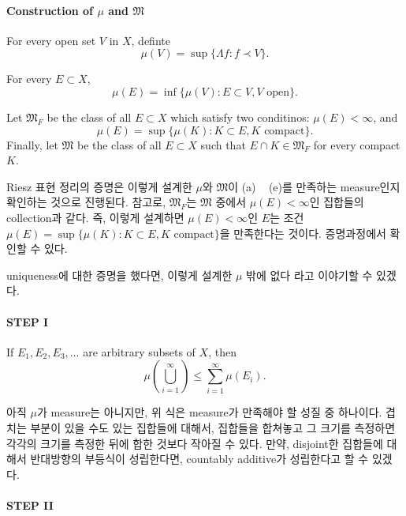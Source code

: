 \documentclass[11pt,reqno]{amsart}
\renewcommand{\(}{\left(}
\renewcommand{\)}{\right)}
\renewcommand{\[}{\left[}
\renewcommand{\]}{\right]}
\newcommand{\M}{\mathfrak{M}}
\begin{document}
\paragraph{Construction of $\mu$ and $\M$}

For every open set $V$ in $X$, definte 
\begin{equation}
  \mu (V) = \sup \{ \Lambda f : f \prec V \}.
\end{equation}

For every $E \subset X$, 
\begin{equation}
  \mu (E) = \inf \{ \mu (V) : E \subset V, V \text{ open} \}.
\end{equation}

Let $\M_F$ be the class of all $E \subset X$ which satisfy two conditinos: $\mu(E) < \infty$, and 
\begin{equation}
  \mu (E) = \sup \{ \mu (K) : K \subset E, K \text{ compact} \}.
\end{equation}
Finally, let $\M$ be the class of all $E \subset X$ such that $E \cap K \in \M_F$ for every compact $K$.

Riesz 표현 정리의 증명은 이렇게 설계한 $\mu$와 $\M$이 (a) ~ (e)를 만족하는 measure인지 확인하는 것으로 진행된다.
참고로, $\M_F$는 $\M$ 중에서 $\mu(E) < \infty$인 집합들의 collection과 같다. 즉, 이렇게 설계하면 $\mu(E) < \infty$인
$E$는 조건 $\mu (E) = \sup \{ \mu (K) : K \subset E, K \text{ compact} \}$을 만족한다는 것이다. 증명과정에서 확인할 
수 있다.

uniqueness에 대한 증명을 했다면, 이렇게 설계한 $\mu$ 밖에 없다 라고 이야기할 수 있겠다.

\paragraph{STEP I}

If $E_1, E_2, E_3, \dots$ are arbitrary subsets of $X$, then
\begin{equation}
  \mu \( \bigcup_{i =1} ^\infty \) \le \sum_{i=1}^\infty \mu(E_i).
\end{equation}

아직 $\mu$가 measure는 아니지만, 위 식은 measure가 만족해야 할 성질 중 하나이다. 겹치는 부분이 있을 수도 있는 집합들에 대해서,
집합들을 합쳐놓고 그 크기를 측정하면 각각의 크기를 측정한 뒤에 합한 것보다 작아질 수 있다. 만약, disjoint한 집합들에 대해서 반대방향의
부등식이 성립한다면, countably additive가 성립한다고 할 수 있겠다.

\paragraph{STEP II}
\end{document}
